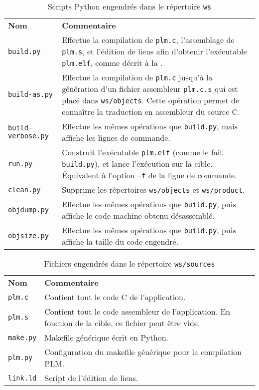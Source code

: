 \begin{table}[t!]
\centering
\begin{tabular}{p{2cm}p{11cm}}
  \textbf{Nom} & \textbf{Commentaire} \\
  \texttt{build.py} & Effectue la compilation de \texttt{plm.c}, l'assemblage de \texttt{plm.s}, et l'édition de liens afin d'obtenir l'exécutable \texttt{plm.elf}, comme décrit à la {}{compilationProgrammePLM}. \\
  \texttt{build-as.py} & Effectue la compilation de \texttt{plm.c} jusqu'à la génération d'un fichier assembleur \texttt{plm.c.s} qui est placé dans \texttt{ws/objects}. Cette opération permet de connaître la traduction en assembleur du source C.\\
  \texttt{build-verbose.py} & Effectue les mêmes opérations que \texttt{build.py}, mais affiche les lignes de commande.\\
  \texttt{run.py} & Construit l'exécutable \texttt{plm.elf} (comme le fait \texttt{build.py}), et lance l'exécution sur la cible. Équivalent à l'option \texttt{-f} de la ligne de commande. \\
  \texttt{clean.py} & Supprime les répertoires \texttt{ws/objects} et \texttt{ws/product}. \\
  \texttt{objdump.py} & Effectue les mêmes opérations que \texttt{build.py}, puis affiche le code machine obtenu désassemblé. \\
  \texttt{objsize.py} & Effectue les mêmes opérations que \texttt{build.py}, puis affiche la taille du code engendré. \\
\end{tabular}
\caption{Scripts Python engendrés dans le répertoire \texttt{ws}}
\ligne
\end{table}

\begin{table}[t!]
\centering
\begin{tabular}{p{2cm}p{11cm}}
  \textbf{Nom} & \textbf{Commentaire} \\
  \texttt{plm.c} & Contient tout le code C de l'application. \\
  \texttt{plm.s} & Contient tout le code assembleur de l'application. En fonction de la cible, ce fichier peut être vide.\\
  \texttt{make.py} & Makefile générique écrit en Python.\\
  \texttt{plm.py} & Configuration du makefile générique pour la compilation PLM.\\
  \texttt{link.ld} & Script de l'édition de liens.\\
\end{tabular}
\caption{Fichiers engendrés dans le répertoire \texttt{ws/sources}}
\ligne
\end{table}

